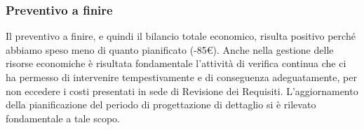 \subsubsection{Preventivo a finire}
Il preventivo a finire, e quindi il bilancio totale economico, risulta positivo perché abbiamo speso meno di quanto pianificato (-85€). Anche nella gestione delle risorse economiche è risultata fondamentale l’attività di verifica continua che ci ha permesso di intervenire tempestivamente e di conseguenza adeguatamente, per non eccedere i costi presentati in sede di Revisione dei Requisiti. 
L’aggiornamento della pianificazione del periodo di progettazione di dettaglio
si è rilevato fondamentale a tale scopo.